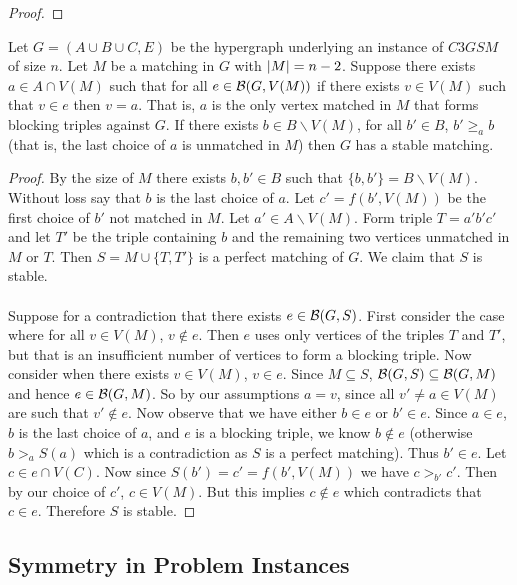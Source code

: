\begin{definition}
\begin{proof}
\end{proof}
\begin{lemma}\label{lemma:fixing}
Let $G = (A\cup B \cup C, E)$ be the hypergraph underlying an instance of $C3GSM$ of size $n$. Let $M$ be a matching in $G$ with $\left|M\right| = n-2$. Suppose there exists $a \in A \cap V(M)$ such that for all $e \in \mathcal{B}(G, V(M))$ if there exists $v \in V(M)$ such that $v \in e$ then $v = a$. That is, $a$ is the only vertex matched in $M$ that forms blocking triples against $G$. If there exists $b \in B\backslash V(M)$, for all $b' \in B$, $b' \geq_a b$ (that is, the last choice of $a$ is unmatched in $M$) then $G$ has a stable matching.
\end{lemma}
\begin{proof}
By the size of $M$ there exists $b,b' \in B$ such that $\{b,b'\} = B \backslash V(M)$. Without loss say that $b$ is the last choice of $a$. Let $c' = f(b', V(M))$ be the first choice of $b'$ not matched in $M$. Let $a' \in A\backslash V(M)$. Form triple $T = a'b'c'$ and let $T'$ be the triple containing $b$ and the remaining two vertices unmatched in $M$ or $T$. Then $S = M \cup \{T, T'\}$ is a perfect matching of $G$. We claim that $S$ is stable.
\paragraph{}
Suppose for a contradiction that there exists $e \in \mathcal{B}(G,S)$. First consider the case where for all $v \in V(M)$, $v \not\in e$. Then $e$ uses only vertices of the triples $T$ and $T'$, but that is an insufficient number of vertices to form a blocking triple. Now consider when there exists $v \in V(M)$, $v \in e$. Since $M \subseteq S$, $\mathcal{B}(G,S) \subseteq \mathcal{B}(G,M)$ and hence $e \in \mathcal{B}(G,M)$. So by our assumptions $a=v$, since all $v' \neq a \in V(M)$ are such that $v' \not\in e$. Now observe that we have either $b \in e$ or $b' \in e$. Since $a \in e$, $b$ is the last choice of $a$, and $e$ is a blocking triple, we know $b \not\in e$ (otherwise $b >_a S(a)$ which is a contradiction as $S$ is a perfect matching). Thus $b' \in e$. Let $c \in e \cap V(C)$. Now since $S(b') = c' = f(b',V(M))$ we have $c >_{b'} c'$. Then by our choice of $c'$, $c \in V(M)$. But this implies $c \not \in e$ which contradicts that $c \in e$. Therefore $S$ is stable.
\end{proof}
\subsection{Symmetry in Problem Instances}\label{subsec:symmetry}

\end{definition}
